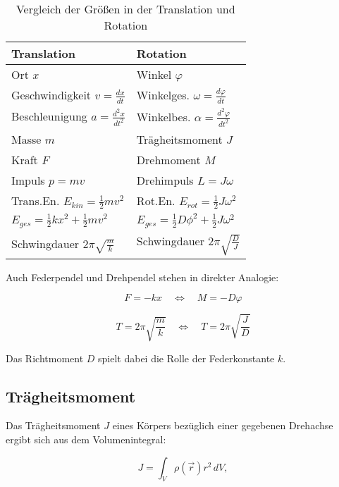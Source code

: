 \begin{table}[h!]
\renewcommand{\arraystretch}{1.75} %
\centering
\begin{tabular}{l|l}
    \textbf{Translation} & \textbf{Rotation} \\
    \hline
    Ort $x$ & Winkel $\varphi$ \\
    Geschwindigkeit $v = \tfrac{dx}{dt}$ & Winkelges. $\omega = \tfrac{d\varphi}{dt}$ \\
    Beschleunigung $a = \tfrac{d^2x}{dt^2}$ & Winkelbes. $\alpha = \tfrac{d^2\varphi}{dt^2}$ \\
    Masse $m$ & Trägheitsmoment $J$ \\
    Kraft $F$ & Drehmoment $M$ \\
    Impuls $p = mv$ & Drehimpuls $L = J\omega$ \\
    Trans.En. $E_{kin} = \tfrac{1}{2}mv^2$ & Rot.En. $E_{rot} = \tfrac{1}{2}J\omega^2$ \\
    $E_{ges} = \frac{1}{2}kx^2 + \frac{1}{2} mv^2$ & $E_{ges} = \frac{1}{2}D\phi^2 + \frac{1}{2} J \omega^2$ \\
    Schwingdauer $2\pi \sqrt{\frac{m}{k}}$ & Schwingdauer $2 \pi \sqrt{\frac{D}{J}}$
\end{tabular}
\caption{Vergleich der Größen in der Translation und Rotation}
\label{tab:translation-rotation}
\end{table}

\vspace{0.25cm}

Auch Federpendel und Drehpendel stehen in direkter Analogie:

\begin{equation}
    F = -kx \quad \Leftrightarrow \quad M = -D\varphi
\end{equation}

\begin{equation}
T = 2\pi\sqrt{\frac{m}{k}} \quad \Leftrightarrow \quad T = 2\pi\sqrt{\frac{J}{D}}
\end{equation}

Das Richtmoment $D$ spielt dabei die Rolle der Federkonstante $k$.

\subsection*{Trägheitsmoment}
Das Trägheitsmoment $J$ eines Körpers bezüglich einer gegebenen Drehachse ergibt sich aus dem Volumenintegral:

\begin{equation}
    J = \int_V \rho(\vec{r}) r^2 \, dV,
\end{equation}

